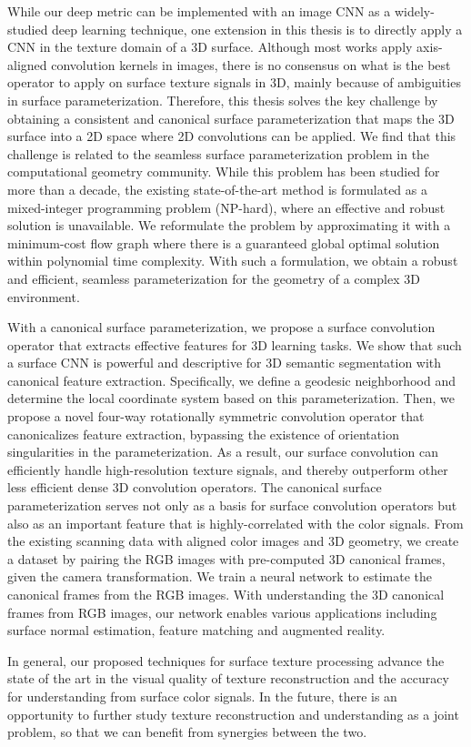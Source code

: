 While our deep metric can be implemented with an image CNN as a widely-studied deep learning technique, one extension in this thesis is to directly apply a CNN in the texture domain of a 3D surface.
%
Although most works apply axis-aligned convolution kernels in images, there is no consensus on what is the best operator to apply on surface texture signals in 3D, mainly because of ambiguities in surface parameterization.
%
Therefore, this thesis solves the key challenge by obtaining a consistent and canonical surface parameterization that maps the 3D surface into a 2D space where 2D convolutions can be applied.
%
We find that this challenge is related to the seamless surface parameterization problem in the computational geometry community. While this problem has been studied for more than a decade, the existing state-of-the-art method is formulated as a mixed-integer programming problem (NP-hard), where an effective and robust solution is unavailable.
%
We reformulate the problem by approximating it with a minimum-cost flow graph where there is a guaranteed global optimal solution within polynomial time complexity. With such a formulation, we obtain a robust and efficient, seamless parameterization for the geometry of a complex 3D environment.

With a canonical surface parameterization, we propose a surface convolution operator that extracts effective features for 3D learning tasks.
%
We show that such a surface CNN is powerful and descriptive for 3D semantic segmentation with canonical feature extraction.
%
Specifically, we define a geodesic neighborhood and determine the local coordinate system based on this parameterization.
Then, we propose a novel four-way rotationally symmetric convolution operator that canonicalizes feature extraction, bypassing the existence of orientation singularities in the parameterization.
%
As a result, our surface convolution can efficiently handle high-resolution texture signals, and thereby outperform other less efficient dense 3D convolution operators.
%
The canonical surface parameterization serves not only as a basis for surface convolution operators but also as an important feature that is highly-correlated with the color signals.
%
From the existing scanning data with aligned color images and 3D geometry, we create a dataset by pairing the RGB images with pre-computed 3D canonical frames, given the camera transformation.
%
We train a neural network to estimate the canonical frames from the RGB images. With understanding the 3D canonical frames from RGB images, our network enables various applications including surface normal estimation, feature matching and augmented reality.

In general, our proposed techniques for surface texture processing advance the state of the art in the visual quality of texture reconstruction and the accuracy for understanding from surface color signals. In the future, there is an opportunity to further study texture reconstruction and understanding as a joint problem, so that we can benefit from synergies between the two.